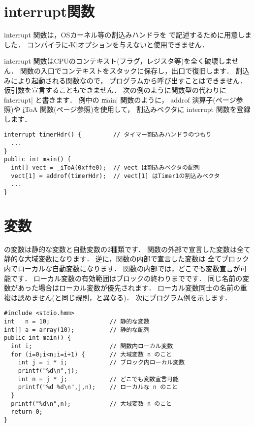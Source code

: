 \section{interrupt関数}
interrupt 関数は，OSカーネル等の割込みハンドラを\cmml
で記述するために用意しました．
コンパイラに\|-K|オプションを与えないと使用できません．

interrupt 関数はCPUのコンテキスト(フラグ，レジスタ等)を全く破壊しません．
関数の入口でコンテキストをスタックに保存し，出口で復旧します．
割込みにより起動される関数なので，
プログラムから呼び出すことはできません．
仮引数を宣言することもできません．
次の例のように関数型の代わりに \|interrupt| と書きます．
例中の \|main| 関数のように，
addrof 演算子(\pageref{chap3:addrof}ページ参照)や
\ul iToA 関数(\pageref{chap4:itoa}ページ参照)を使用して，
割込みベクタに interrupt 関数を登録します．

\begin{mylist}
\begin{verbatim}
interrupt timerHdr() {         // タイマー割込みハンドラのつもり
  ...
}
public int main() {
  int[] vect = _iToA(0xffe0);  // vect は割込みベクタの配列
  vect[1] = addrof(timerHdr);  // vect[1] はTimer1の割込みベクタ
  ...
}
\end{verbatim}
\end{mylist}

\section{変数}

\cmml の変数は静的な変数と自動変数の2種類です．
関数の外部で宣言した変数は全て静的な大域変数になります．
逆に，関数の内部で宣言した変数は
全てブロック内でローカルな自動変数になります．
関数の内部では，どこでも変数宣言が可能です．
ローカル変数の有効範囲はブロックの終わりまでです．
同じ名前の変数があった場合はローカル変数が優先されます．
ローカル変数同士の名前の重複は認めません(\javal と同じ規則，\cl と異なる)．
次にプログラム例を示します．

\begin{mylist}
\begin{verbatim}
#include <stdio.hmm>
int   n = 10;                 // 静的な変数
int[] a = array(10);          // 静的な配列
public int main() {
  int i;                      // 関数内ローカル変数
  for (i=0;i<n;i=i+1) {       // 大域変数 n のこと
    int j = i * i;            // ブロック内ローカル変数
    printf("%d\n",j);
    int n = j * j;            // どこでも変数宣言可能
    printf("%d %d\n",j,n);    // ローカルな n のこと
  }                        
  printf("%d\n",n);           // 大域変数 n のこと
  return 0;
}
\end{verbatim}
\end{mylist}

